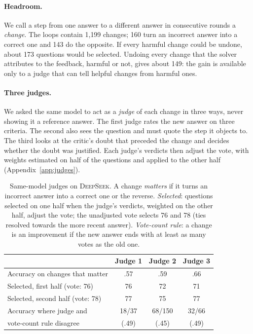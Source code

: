 \documentclass[11pt]{article}
\newcommand{\ds}{\textsc{DeepSeek}}
\begin{document}
\paragraph{Headroom.}
We call a step from one answer to a different answer in consecutive rounds a \emph{change}.
The loops contain 1{,}199 changes; 160 turn an incorrect answer into a correct one and 143 do the opposite.
If every harmful change could be undone, about 173 questions would be selected.
Undoing every change that the solver attributes to the feedback, harmful or not, gives about 149: the gain is available only to a judge that can tell helpful changes from harmful ones.

\paragraph{Three judges.}
We asked the same model to act as a \emph{judge} of each change in three ways, never showing it a reference answer.
The first judge rates the new answer on three criteria.
The second also sees the question and must quote the step it objects to.
The third looks at the critic's doubt that preceded the change and decides whether the doubt was justified.
Each judge's verdicts then adjust the vote, with weights estimated on half of the questions and applied to the other half (Appendix~\ref{app:judges}).

\begin{table}[t]
\centering
\small
\setlength{\tabcolsep}{3.5pt}
\begin{tabular}{@{}l ccc@{}}
\toprule
 & Judge 1 & Judge 2 & Judge 3 \\
\midrule
Accuracy on changes that matter & .57 & .59 & .66 \\
Selected, first half (vote: 76) & 76 & 72 & 71 \\
Selected, second half (vote: 78) & 77 & 75 & 77 \\
Accuracy where judge and & 18/37 & 68/150 & 32/66 \\
\quad vote-count rule disagree & (.49) & (.45) & (.49) \\
\bottomrule
\end{tabular}
\caption{Same-model judges on \ds. A change \emph{matters} if it turns an incorrect answer into a correct one or the reverse. \emph{Selected}: questions selected on one half when the judge's verdicts, weighted on the other half, adjust the vote; the unadjusted vote selects 76 and 78 (ties resolved towards the more recent answer). \emph{Vote-count rule}: a change is an improvement if the new answer ends with at least as many votes as the old one.}
\label{tab:judges}
\end{table}
\end{document}
